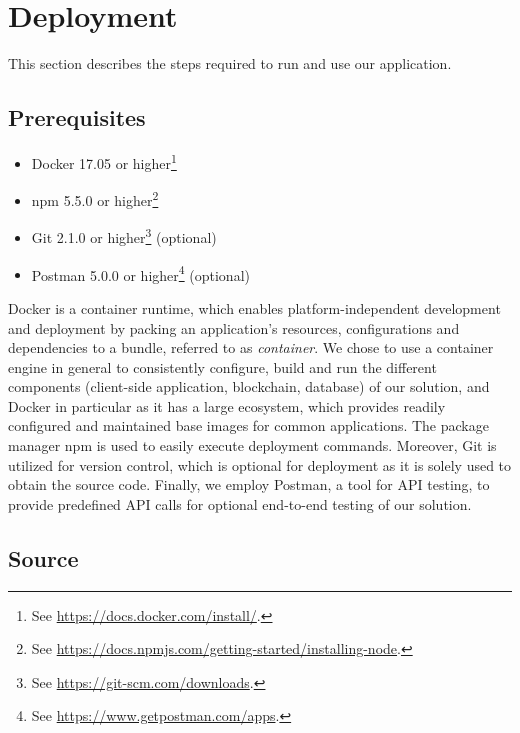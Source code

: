 	\section{Deployment}
	\label{sec:deployment}

		This section describes the steps required to run and use our application.

		\subsection*{Prerequisites}
		\label{subsec:deployment-prerequisites}

			\begin{itemize}
				\item Docker 17.05 or higher\footnote{See \url{https://docs.docker.com/install/}.}
				\item npm 5.5.0 or higher\footnote{See \url{https://docs.npmjs.com/getting-started/installing-node}.}
				\item Git 2.1.0 or higher\footnote{See \url{https://git-scm.com/downloads}.} (optional)
				\item Postman 5.0.0 or higher\footnote{See \url{https://www.getpostman.com/apps}.} (optional)
			\end{itemize}

			Docker is a container runtime, which enables platform-independent development and deployment by packing an application's resources, configurations and dependencies to a bundle, referred to as \emph{container}.
			We chose to use a container engine in general to consistently configure, build and run the different components (client-side application, blockchain, database) of our solution, and Docker in particular as it has a large ecosystem, which provides readily configured and maintained base images for common applications.
			The package manager npm is used to easily execute deployment commands.
			Moreover, Git is utilized for version control, which is optional for deployment as it is solely used to obtain the source code.
			Finally, we employ Postman, a tool for API testing, to provide predefined API calls for optional end-to-end testing of our solution.

		\subsection*{Source}
		\label{subsec:deployment-source}

